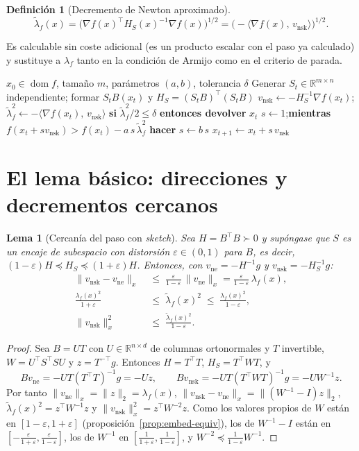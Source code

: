 \documentclass[11pt,a4paper,oneside]{book}
\newtheorem{lema}[teorema]{Lema}
\theoremstyle{definition}
\newtheorem{definicion}[teorema]{Definición}
\theoremstyle{remark}
\newcommand{\R}{\mathbb{R}}
\newcommand{\T}{^{\top}}
\newcommand{\eps}{\varepsilon}
\newcommand{\nrm}[1]{\lVert #1\rVert}
\newcommand{\ip}[2]{\langle #1,\, #2\rangle}
\DeclareMathOperator{\dom}{dom}
\newcommand{\lamf}{\lambda_f}
\newcommand{\lamt}{\widetilde{\lambda}_f}
\newcommand{\vne}{v_{\mathrm{ne}}}
\newcommand{\vnsk}{v_{\mathrm{nsk}}}
\begin{document}
\begin{definicion}[Decremento de Newton aproximado]
\[ \lamt(x)=\bigl(\nabla f(x)\T H_S(x)^{-1}\nabla f(x)\bigr)^{1/2}=\bigl(-\ip{\nabla f(x)}{\vnsk}\bigr)^{1/2}. \]
\end{definicion}

Es calculable sin coste adicional (es un producto escalar con el paso ya calculado) y sustituye a $\lamf$
tanto en la condición de Armijo como en el criterio de parada.

\begin{algorithm}[ht]
\caption{Newton Sketch con búsqueda lineal (sin restricciones)}\label{alg:ns}
\begin{algorithmic}[1]
\Require $x_0\in\dom f$, tamaño $m$, parámetros $(a,b)$, tolerancia $\delta$
  \State Generar $S_t\in\R^{m\times n}$ independiente; formar $S_tB(x_t)$ y $H_S=(S_tB)\T(S_tB)$
  \State $\vnsk\gets-H_S^{-1}\nabla f(x_t)$;\quad$\lamt^2\gets-\ip{\nabla f(x_t)}{\vnsk}$
  \State \textbf{si} $\lamt^2/2\le\delta$ \textbf{entonces devolver} $x_t$
  \State $s\gets1$;\quad\textbf{mientras} $f(x_t+s\vnsk)>f(x_t)-a\,s\,\lamt^2$ \textbf{hacer} $s\gets b\,s$
  \State $x_{t+1}\gets x_t+s\,\vnsk$
\EndFor
\end{algorithmic}
\end{algorithm}

\section{El lema básico: direcciones y decrementos cercanos}

\begin{lema}[Cercanía del paso con \emph{sketch}]\label{lem:ns-cerca}
Sea $H=B\T B\succ0$ y supóngase que $S$ es un encaje de subespacio con distorsión $\eps\in(0,1)$ para $B$, es
decir, $(1-\eps)H\preceq H_S\preceq(1+\eps)H$. Entonces, con $\vne=-H^{-1}g$ y $\vnsk=-H_S^{-1}g$:
\begin{align}
  \nrm{\vnsk-\vne}_x\;&\le\;\frac{\eps}{1-\eps}\,\nrm{\vne}_x=\frac{\eps}{1-\eps}\,\lamf(x), \label{eq:ns-dir}\\
  \frac{\lamf(x)^2}{1+\eps}\;&\le\;\lamt(x)^2\;\le\;\frac{\lamf(x)^2}{1-\eps}, \label{eq:ns-dec}\\
  \nrm{\vnsk}_x^2\;&\le\;\frac{\lamt(x)^2}{1-\eps}. \label{eq:ns-norma}
\end{align}
\end{lema}

\begin{proof}
Sea $B=UT$ con $U\in\R^{n\times d}$ de columnas ortonormales y $T$ invertible, $W=U\T S\T SU$ y $z=T^{-\top}g$.
Entonces $H=T\T T$, $H_S=T\T WT$, y
\[ B\vne=-UT(T\T T)^{-1}g=-Uz,\qquad B\vnsk=-UT(T\T WT)^{-1}g=-UW^{-1}z . \]
Por tanto $\nrm{\vne}_x=\nrm{z}_2=\lamf(x)$, $\nrm{\vnsk-\vne}_x=\nrm{(W^{-1}-I)z}_2$, $\lamt(x)^2=z\T W^{-1}z$ y
$\nrm{\vnsk}_x^2=z\T W^{-2}z$. Como los valores propios de $W$ están en $[1-\eps,1+\eps]$
(proposición~\ref{prop:embed-equiv}), los de $W^{-1}-I$ están en $[-\frac{\eps}{1+\eps},\frac{\eps}{1-\eps}]$, los de
$W^{-1}$ en $[\frac{1}{1+\eps},\frac{1}{1-\eps}]$, y $W^{-2}\preceq\frac{1}{1-\eps}W^{-1}$.
\end{proof}
\end{document}
